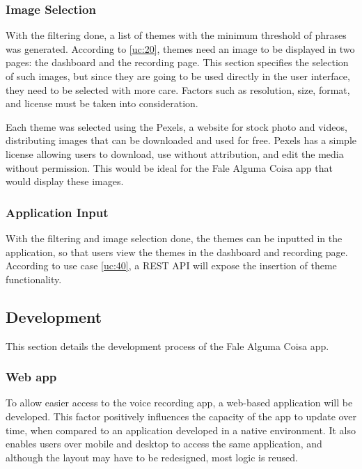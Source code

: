 \subsubsection{Image Selection}

With the filtering done, a list of themes with the minimum threshold of phrases was generated. According to \ref{uc:20}, themes need an image to be displayed in two pages: the dashboard and the recording page. This section specifies the selection of such images, but since they are going to be used directly in the user interface, they need to be selected with more care. Factors such as resolution, size, format, and license must be taken into consideration.

Each theme was selected using the Pexels, a website for stock photo and videos, distributing images that can be downloaded and used for free. Pexels has a simple license allowing users to download, use without attribution, and edit the media without permission. This would be ideal for the Fale Alguma Coisa app that would display these images.

\subsubsection{Application Input}

With the filtering and image selection done, the themes can be inputted in the application, so that users view the themes in the dashboard and recording page. According to use case \ref{uc:40}, a REST API will expose the insertion of theme functionality.  

\subsection{Development}
\label{sec:app-development}

This section details the development process of the Fale Alguma Coisa app. 

\subsubsection{Web app}

To allow easier access to the voice recording app, a web-based application will be developed. This factor positively influences the capacity of the app to update over time, when compared to an application developed in a native environment. It also enables users over mobile and desktop to access the same application, and although the layout may have to be redesigned, most logic is reused.

